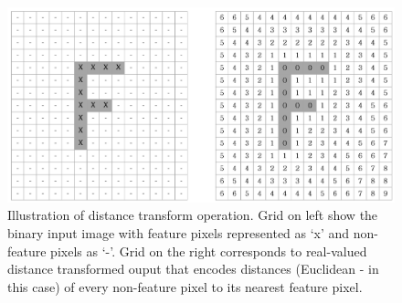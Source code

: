 \begin{figure}[ht]
\centering
        \includegraphics[width = \textwidth]{Graphics/Fundamentals/dst_tf}
    \caption[Illustration of Distance Transform]{Illustration of distance transform operation. Grid on left show the binary input image with feature pixels represented as `x' and non-feature pixels as `-'. Grid on the right corresponds to real-valued distance transformed ouput that encodes distances (Euclidean - in this case) of every non-feature pixel to its nearest feature pixel.}
	\label{fig: disttrnsf} 
\end{figure}






